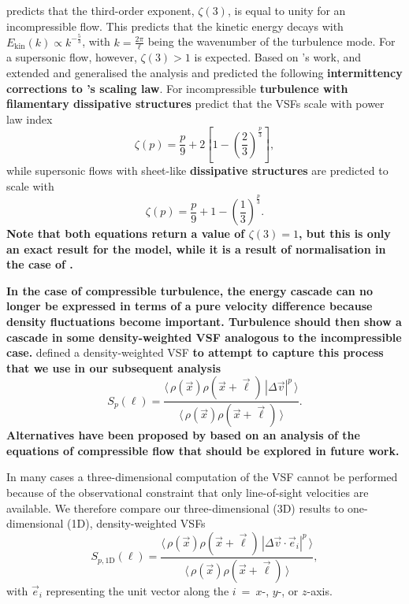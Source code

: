 \citet{Kolmogorov1941} predicts that the third-order exponent, $\zeta(3)$, is equal to unity for an incompressible flow.
This predicts that the kinetic energy decays with $E_{\mathrm{kin}}(k) \propto k^{-\frac{5}{3}}$, with $k = \frac{2 \pi}{\ell}$ being the wavenumber of the turbulence mode.
For a supersonic flow, however, $\zeta(3) >1$ is expected.
Based on \citeauthor{Kolmogorov1941}'s work, \citet{She1994} and \citet{Boldyrev2002} extended and generalised the analysis and predicted the following \textbf{intermittency corrections to \citeauthor{Kolmogorov1941}'s scaling law}.
For incompressible \textbf{turbulence with filamentary dissipative structures} \citet{She1994} predict that
the VSFs scale with power law index
\begin{equation}
	\zeta(p) = \frac{p}{9} + 2 \left[ 1 - \left( \frac{2}{3} \right)^{\frac{p}{3}} \right] ,
	\label{equ:method:she}
\end{equation}
while supersonic flows with sheet-like \textbf{dissipative structures} are predicted to scale with \citep{Boldyrev2002}
\begin{equation}
	\zeta(p) = \frac{p}{9} + 1 - \left( \frac{1}{3} \right)^{\frac{p}{3}}.
	\label{equ:method:boldyrev}
\end{equation}
\textbf{\noindent
    Note that both equations return a value of $\zeta(3) =1$, but this is only an exact result for the \citeauthor{She1994} model, while it is a result of normalisation in the case of \citeauthor{Boldyrev2002}. 
}

\textbf{In the case of compressible turbulence, the energy cascade can no longer be expressed in terms of a pure velocity difference because density fluctuations become important.  Turbulence should then show a cascade in some density-weighted VSF analogous to the incompressible case.}
\citet{Padoan2016a} defined a density-weighted VSF \textbf{to attempt to capture this process that we use in our subsequent analysis}
\begin{equation}
	{S}_p (\ell) = \frac{\langle \, \rho(\vec{x}) \rho(\vec{x}+\vec{\ell}) \, |\Delta \vec{v}|^p  \, \rangle}{\langle  \, \rho(\vec{x}) \rho(\vec{x}+\vec{\ell}) \, \rangle}.
	\label{equ:method:def_vsf_dw}
\end{equation}
\textbf{Alternatives have been proposed by \citet{Kritsuk2013a} based on an analysis of the equations of compressible flow that should be explored in future work.}

In many cases a three-dimensional computation of the VSF cannot be performed because of the observational constraint that only line-of-sight velocities are available.
We therefore compare our three-dimensional (3D) results to one-dimensional (1D), density-weighted VSFs
\begin{equation}
	\mathit{S}_{p,\mathrm{1D}} (\ell) = \frac{\langle \, \rho(\vec{x}) \rho(\vec{x}+\vec{\ell}) \, |\Delta 
        \vec{v} \cdot \vec{e}_i|^p  \, \rangle}{\langle  \, \rho(\vec{x}) \rho(\vec{x}+\vec{\ell}) \, \rangle} ,
	\label{equ:method:def_vsf_1d}
\end{equation}
with $\vec{e}_i$ representing the unit vector along the $i$~=~$x$-, $y$-, or $z$-axis.

